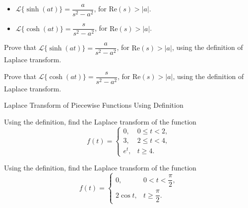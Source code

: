 \documentclass[12pt, a4paper]{article}
\begin{document}
\clearpage

\begin{definition}
	\begin{itemize}
		\item $\mathcal{L}\{\sinh(at)\} = \dfrac{a}{s^2 - a^2}$, for $\text{Re}(s) > |a|$.
		\item $\mathcal{L}\{\cosh(at)\} = \dfrac{s}{s^2 - a^2}$, for $\text{Re}(s) > |a|$.
	\end{itemize}
\end{definition}

\vspace{20pt}

\begin{problem}
	Prove that $\mathcal{L}\{\sinh(at)\} = \dfrac{a}{s^2 - a^2}$, for $\text{Re}(s) > |a|$, using the definition of Laplace transform.
\end{problem}

\clearpage

\begin{problem}
	Prove that $\mathcal{L}\{\cosh(at)\} = \dfrac{s}{s^2 - a^2}$, for $\text{Re}(s) > |a|$, using the definition of Laplace transform.
\end{problem}

\clearpage

\begin{heading}
	Laplace Transform of Piecewise Functions Using Definition
\end{heading}

\vspace{20pt}

\begin{problem}
	Using the definition, find the Laplace transform of the function
	\[
	f(t)=
	\begin{cases}
	0, & 0\le t<2,\\
	3, & 2\le t<4,\\
	e^t, & t\ge 4.
	\end{cases}
	\]
		
\end{problem}

\clearpage

\begin{problem}
	Using the definition, find the Laplace transform of the function
	\[
	f(t)=
	\begin{cases}
	0, & 0<t<\dfrac{\pi}{2},\\
	2\cos t, & t\ge \dfrac{\pi}{2}.
	\end{cases}
	\]
	
\end{problem}
\end{document}
